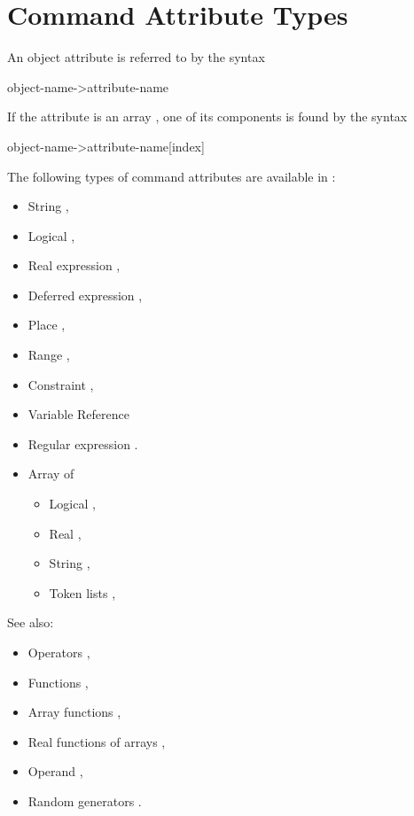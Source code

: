 \section{Command Attribute Types}
\label{sec:attribute}
An object attribute is referred to by the syntax
\begin{example}
object-name->attribute-name
\end{example}
If the attribute is an array ,
one of its components is found by the syntax
\begin{example}
object-name->attribute-name[index]
\end{example}
The following types of command attributes are available in \opal:
\begin{itemize}
\item String ,
\item Logical ,
\item Real expression ,
\item Deferred expression ,
\item Place ,
\item Range ,
\item Constraint ,
\item Variable Reference 
\item Regular expression .
\item Array  of
  \begin{itemize}
  \item Logical ,
  \item Real ,
  \item String ,
  \item Token lists ,
  \end{itemize}
\end{itemize}
See also:
\begin{itemize}
\item Operators ,
\item Functions ,
\item Array functions ,
\item Real functions of arrays ,
\item Operand ,
\item Random generators .
\end{itemize}

